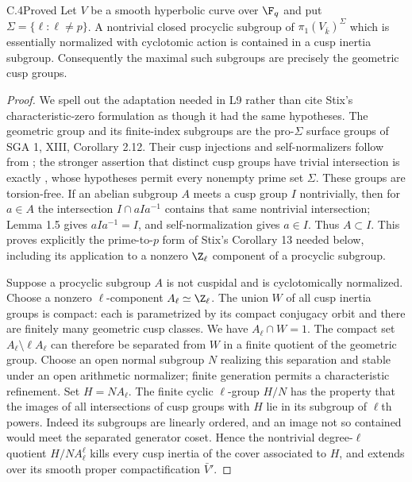 \begin{claim}{C.4}{Proved}
Let $V$ be a smooth hyperbolic curve over $\F_q$ and put
$\Sigma=\{\ell:\ell\ne p\}$. A nontrivial closed procyclic subgroup of
$\pi_1(V_{\bar k})^\Sigma$ which is essentially normalized with cyclotomic
action is contained in a cusp inertia subgroup. Consequently the maximal
such subgroups are precisely the geometric cusp groups.
\end{claim}
\begin{proof}
We spell out the adaptation needed in L9 rather than cite Stix's
characteristic-zero formulation as though it had the same hypotheses.
The geometric group and its finite-index subgroups are the pro-$\Sigma$
surface groups of SGA 1, XIII, Corollary 2.12. Their cusp injections and
self-normalizers follow from \citet[Proposition 1.2]{BC_MochComb};
the stronger assertion that distinct cusp groups have trivial intersection
is exactly \citet[Lemma 1.5]{BC_HMNodes}, whose hypotheses permit every
nonempty prime set $\Sigma$. These groups are torsion-free. If an abelian
subgroup $A$ meets a cusp group $I$ nontrivially, then for $a\in A$ the
intersection $I\cap aIa^{-1}$ contains that same nontrivial intersection;
Lemma 1.5 gives $aIa^{-1}=I$, and self-normalization gives $a\in I$.
Thus $A\subset I$. This proves explicitly the prime-to-$p$ form of
Stix's Corollary 13 needed below, including its application to a nonzero
$\Z_\ell$ component of a procyclic subgroup.

Suppose a procyclic subgroup $A$ is not cuspidal and is cyclotomically
normalized. Choose a nonzero $\ell$-component $A_\ell\simeq\Z_\ell$.
The union $W$ of all cusp inertia groups is compact: each is parametrized
by its compact conjugacy orbit and there are finitely many geometric cusp
classes. We have $A_\ell\cap W=1$. The compact set
$A_\ell\setminus\ell A_\ell$ can therefore be separated from $W$ in a
finite quotient of the geometric group. Choose an open normal subgroup
$N$ realizing this separation and stable under an open arithmetic
normalizer; finite generation permits a characteristic refinement.
Set $H=NA_\ell$. The finite cyclic $\ell$-group $H/N$ has the property
that the images of all intersections of cusp groups with $H$ lie in its
subgroup of $\ell$th powers.
Indeed its subgroups are linearly ordered, and an image not so contained
would meet the separated generator coset. Hence the nontrivial degree-$\ell$
quotient $H/NA_\ell^\ell$ kills every cusp inertia of the cover associated
to $H$, and extends over its smooth proper compactification $\bar V'$.


\end{proof}
